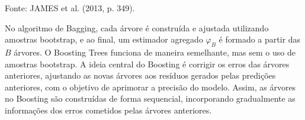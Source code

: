 \documentclass[
  12pt,
  a4paper,
]{scrreprt}
\begin{document}
\begin{algo}


\caption{\label{algo-boos}Fonte: JAMES et al. (2013, p. 349).}

\end{algo}%

No algoritmo de Bagging, cada árvore é construída e ajustada utilizando
amostras bootstrap, e ao final, um estimador agregado
\(\varphi_B\)\hspace{0pt} é formado a partir das \(B\) árvores. O
Boosting Trees funciona de maneira semelhante, mas sem o uso de amostras
bootstrap. A ideia central do Boosting é corrigir os erros das árvores
anteriores, ajustando as novas árvores aos resíduos gerados pelas
predições anteriores, com o objetivo de aprimorar a precisão do modelo.
Assim, as árvores no Boosting são construídas de forma sequencial,
incorporando gradualmente as informações dos erros cometidos pelas
árvores anteriores.
\end{document}
